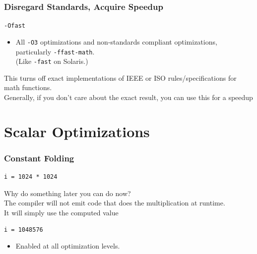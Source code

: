 \begin{frame}[fragile]
  \frametitle{Disregard Standards, Acquire Speedup}

  
  {\tt -Ofast}

  \begin{itemize}
    \item All {\tt -O3} optimizations and non-standards compliant optimizations,
      particularly {\tt -ffast-math}. \\ 
 (Like {\tt -fast} on Solaris.)
  \end{itemize}
  This turns off exact implementations of IEEE or ISO rules/specifications for math
  functions.\\[1em]

  Generally, if you don't care about the exact result, you can use this for
  a speedup
  
\end{frame}

\section{Scalar Optimizations}
\begin{frame}[fragile]
  \frametitle{Constant Folding}

  
  \begin{lstlisting}
i = 1024 * 1024
  \end{lstlisting}

  Why do something later you can do now?\\[1em]

  The compiler will not emit code that does the multiplication at runtime.\\
  It will simply use the computed value

  \begin{lstlisting}
i = 1048576
  \end{lstlisting}

  \begin{itemize}
    \item Enabled at all optimization levels.
  \end{itemize}
  
\end{frame}

